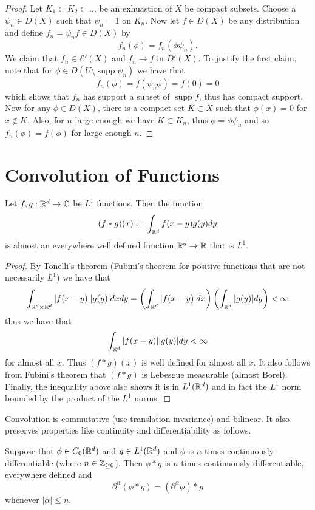 \documentclass[twoside, a4paper, 10pt]{amsart}
\begin{document}
\begin{proof} Let $K_1 \subset K_2 \subset \ldots $ be an exhuastion of $X$ be compact subsets. Choose a $\psi_n \in D(X)$ such that $\psi_n = 1$ on $K_n$. Now let $f \in D(X)$ be any distribution and define $f_n = \psi_n f \in D(X)$ by $$f_n(\phi) = f_n(\phi \psi_n).$$ We claim that $f_n \in \mathcal{E}'(X)$ and $f_n \to f$ in $D'(X)$. To justify the first claim, note that for $\phi \in D(U \setminus \operatorname{supp} \psi_n)$ we have that $$f_n(\phi) = f(\psi_n \phi) = f(0) = 0$$ which shows that $f_n$ has support a subset of $\operatorname{supp} f$, thus has compact support. Now for any $\phi \in D(X)$, there is a compact set $K \subset X$ such that $\phi(x) = 0$ for $x \notin K$. Also, for $n$ large enough we have $K \subset K_n$, thus $\phi = \phi \psi_n$ and so $f_n(\phi) = f(\phi)$ for large enough $n$. \end{proof}

\section{Convolution of Functions}

\begin{prop}\label{prop: convolution of L1 is L1} Let $f,g:\mathbb{R}^d \to \mathbb{C}$ be $L^1$ functions. Then the function $$(f * g) (x) := \int_{\mathbb{R}^d} f(x-y)g(y) dy$$ is almost an everywhere well defined function $\mathbb{R}^d \to \mathbb{R}$ that is $L^1$.

\end{prop}

\begin{proof} By Tonelli's theorem (Fubini's theorem for positive functions that are not necessarily $L^1$) we have that $$\int_{\mathbb{R}^d \times \mathbb{R}^d} |f(x-y)||g(y)|dx dy = \left(\int_{\mathbb{R}^d} |f(x-y)| dx \right) \left( \int_{\mathbb{R}^d} |g(y)| dy \right) < \infty$$ thus we have that $$\int_{\mathbb{R}^d} |f(x-y)||g(y)| dy < \infty$$ for almost all $x$. Thus $(f*g)(x)$ is well defined for almost all $x$. It also follows from Fubini's theorem that $(f*g)$ is Lebesgue measurable (almost Borel). Finally, the inequality above also shows it is in $L^1(\mathbb{R}^d)$ and in fact the $L^1$ norm bounded by the product of the $L^1$ norms. \end{proof}

Convolution is commutative (use translation invariance) and bilinear. It also preserves properties like continuity and differentiability as follows.

\begin{prop} Suppose that $\phi \in C_0(\mathbb{R}^d)$ and $ g \in L^1(\mathbb{R}^d)$ and $\phi$ is $n$ times continuously differentiable (where $n \in \mathbb{Z}_{\geq 0}$). Then $\phi*g$ is $n$ times continuously differentiable, everywhere defined and $$\partial^{\alpha} (\phi * g) = (\partial^{\alpha} \phi) * g$$ whenever $|\alpha|\leq n$.

\end{prop}
\end{document}
